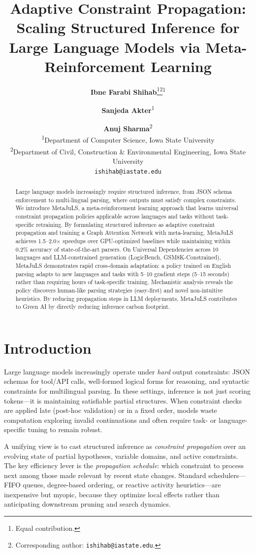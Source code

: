 \documentclass[11pt]{article}
\title{Adaptive Constraint Propagation: Scaling Structured Inference for Large Language Models via Meta-Reinforcement Learning}
\author{
\textbf{Ibne Farabi Shihab}\thanks{Equal contribution.}\thanks{Corresponding author: \texttt{ishihab@iastate.edu}.}\textsuperscript{1}
\and
\textbf{Sanjeda Akter}\footnotemark[1]\textsuperscript{1}
\and
\textbf{Anuj Sharma}\textsuperscript{2}
\\[2pt]
\textsuperscript{1}Department of Computer Science, Iowa State University \\
\textsuperscript{2}Department of Civil, Construction \& Environmental Engineering, Iowa State University \\
\texttt{ishihab@iastate.edu}
}
\begin{document}
\maketitle
\begin{abstract}
Large language models increasingly require structured inference, from JSON schema enforcement to multi-lingual parsing, where outputs must satisfy complex constraints. We introduce MetaJuLS, a meta-reinforcement learning approach that learns universal constraint propagation policies applicable across languages and tasks without task-specific retraining. By formulating structured inference as adaptive constraint propagation and training a Graph Attention Network with meta-learning, MetaJuLS achieves 1.5--2.0$\times$ speedups over GPU-optimized baselines while maintaining within 0.2\% accuracy of state-of-the-art parsers. On Universal Dependencies across 10 languages and LLM-constrained generation (LogicBench, GSM8K-Constrained), MetaJuLS demonstrates rapid cross-domain adaptation: a policy trained on English parsing adapts to new languages and tasks with 5--10 gradient steps (5--15 seconds) rather than requiring hours of task-specific training. Mechanistic analysis reveals the policy discovers human-like parsing strategies (easy-first) and novel non-intuitive heuristics. By reducing propagation steps in LLM deployments, MetaJuLS contributes to Green AI by directly reducing inference carbon footprint.
\end{abstract}
\section{Introduction}

Large language models increasingly operate under \emph{hard} output constraints: JSON schemas for tool/API calls, well-formed logical forms for reasoning, and syntactic constraints for multilingual parsing. In these settings, inference is not just scoring tokens—it is maintaining satisfiable partial structures. When constraint checks are applied late (post-hoc validation) or in a fixed order, models waste computation exploring invalid continuations and often require task- or language-specific tuning to remain robust.

A unifying view is to cast structured inference as \emph{constraint propagation} over an evolving state of partial hypotheses, variable domains, and active constraints. The key efficiency lever is the \emph{propagation schedule}: which constraint to process next among those made relevant by recent state changes. Standard schedulers—FIFO queues, degree-based ordering, or reactive activity heuristics—are inexpensive but myopic, because they optimize local effects rather than anticipating downstream pruning and search dynamics.
\end{document}
